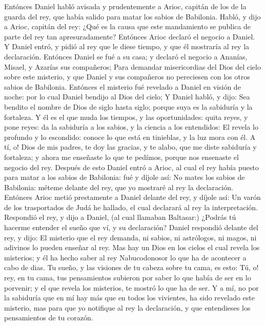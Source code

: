 \bverse Entónces Daniel habló avisada y prudentemente a Arioc, capitán de los de la guarda del rey, que había salido para matar los sabios de Babilonia.
\bverse Habló, y dijo a Arioc, capitán del rey: ¿Qué es la causa que este mandamiento se publica de parte del rey tan apresuradamente? Entónces Arioc declaró el negocio a Daniel.
\bverse Y Daniel entró, y pidió al rey que le diese tiempo, y que él mostraría al rey la declaración.
\bverse Entónces Daniel se fué a su casa; y declaró el negocio a Ananías, Misael, y Azarías sus compañeros;
\bverse Para demandar misericordias del Dios del cielo sobre este misterio, y que Daniel y sus compañeros no pereciesen con los otros sabios de Babilonia.
\bverse Entónces el misterio fué revelado a Daniel en visión de noche: por lo cual Daniel bendijo al Dios del cielo;
\bverse Y Daniel habló, y dijo: Sea bendito el nombre de Dios de siglo hasta siglo; porque suya es la sabiduría y la fortaleza.
\bverse Y él es el que muda los tiempos, y las oportunidades: quita reyes, y pone reyes: da la sabiduría a los sabios, y la ciencia a los entendidos:
\bverse El revela lo profundo y lo escondido: conoce lo que está en tinieblas, y la luz mora con él.
\bverse A tí, o! Dios de mis padres, te doy las gracias, y te alabo, que me diste sabiduría y fortaleza; y ahora me enseñaste lo que te pedímos, porque nos ensenaste el negocio del rey.
\bverse Después de esto Daniel entró a Arioc, al cual el rey había puesto para matar a los sabios de Babilonia: fué y díjole así: No mates los sabios de Babilonia: méteme delante del rey, que yo mostraré al rey la declaración.
\bverse Entónces Arioc metió prestamente a Daniel delante del rey, y díjole así: Un varón de los trasportados de Judá he hallado, el cual declarará al rey la interpretación.
\bverse Respondió el rey, y dijo a Daniel, (al cual llamaban Baltasar:) ¿Podrás tú hacerme entender el sueño que ví, y su declaración?
\bverse Daniel respondió delante del rey, y dijo: El misterio que el rey demanda, ni sabios, ni astrólogos, ni magos, ni adivinos lo pueden enseñar al rey.
\bverse Mas hay un Dios en los cielos el cual revela los misterios; y él ha hecho saber al rey Nabucodonosor lo que ha de acontecer a cabo de dias. Tu sueño, y las visiones de tu cabeza sobre tu cama, es esto:
\bverse Tú, o! rey, en tu cama, tus pensamientos subieron por saber lo que había de ser en lo porvenir; y el que revela los misterios, te mostró lo que ha de ser.
\bverse Y a mí, no por la sabiduría que en mí hay más que en todos los vivientes, ha sido revelado este misterio, mas para que yo notifique al rey la declaración, y que entendieses los pensamientos de tu corazón.
